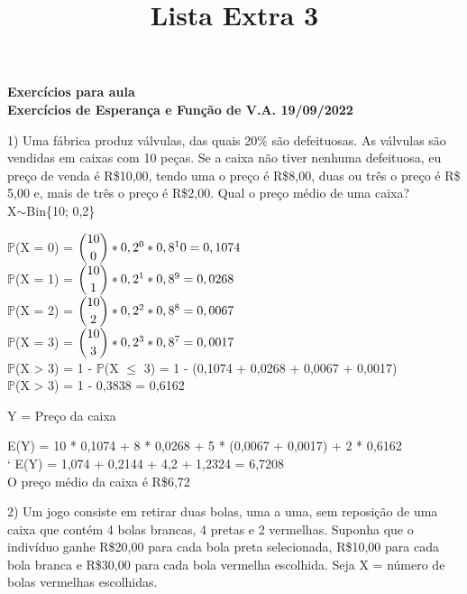 \documentclass[12pt,a4paper]{article}
\title{Lista Extra 3}
\date{}
\begin{document}
	\maketitle
	\begin{center}
		\textbf{Exercícios para aula}\\
		\textbf{Exercícios de Esperança e Função de V.A. 19/09/2022}
	\end{center}
	1) Uma fábrica produz válvulas, das quais 20\% são defeituosas. As válvulas são vendidas em caixas com 10 peças. Se a caixa não tiver nenhuma defeituosa, eu preço de venda é R\$10,00, tendo uma o preço é R\$8,00, duas ou três o preço é R\$ 5,00 e, mais de três o preço é R\$2,00. Qual o preço médio de uma caixa?
	\vspace{1cm}\\
	X$\sim$Bin\{10; 0,2\}
	\vspace{1cm}
	\begin{center}
		$\mathbb{P}$(X = 0) = $\dbinom{10}{0} * 0,2^0 * 0,8^10 = 0,1074$
		\vspace{1cm}\\
		$\mathbb{P}$(X = 1) = $\dbinom{10}{1} * 0,2^1 * 0,8^9 = 0,0268$
		\vspace{1cm}\\
		$\mathbb{P}$(X = 2) = $\dbinom{10}{2} * 0,2^2 * 0,8^8 = 0,0067$
		\vspace{1cm}\\
		$\mathbb{P}$(X = 3) = $\dbinom{10}{3} * 0,2^3 * 0,8^7 = 0,0017$
		\vspace{1cm}\\
		$\mathbb{P}$(X > 3) = 1 - $\mathbb{P}$(X $\leq$ 3) = 1 - (0,1074 + 0,0268 + 0,0067 + 0,0017)
		\vspace{0.25cm}\\
		$\mathbb{P}$(X > 3) = 1 - 0,3838 = 0,6162
	\end{center}
	\vspace{1cm}
	Y = Preço da caixa
	\vspace{1cm}\\
	\begin{center}	
		E(Y) = 10 * 0,1074 + 8 * 0,0268 + 5 * (0,0067 + 0,0017) + 2 * 0,6162
		\vspace{0.25cm}\\`
		E(Y) =  1,074 + 0,2144 + 4,2 + 1,2324 = 6,7208
		\vspace{1cm}\\
		O preço médio da caixa é R\$6,72
	\end{center}
	\vspace{1cm}
	2) Um jogo consiste em retirar duas bolas, uma a uma, sem reposição de uma caixa que contém 4 bolas brancas, 4 pretas e 2 vermelhas. Suponha que o indivíduo ganhe R\$20,00 para cada bola preta selecionada, R\$10,00 para cada bola branca e R\$30,00 para cada bola vermelha escolhida. Seja X = número de bolas vermelhas escolhidas.\\
\end{document}
